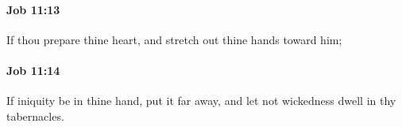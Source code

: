 		\paragraph{Job 11:13} %
			\label{JOB-11-13}

			If thou prepare thine heart, and stretch out thine hands toward him;


		\paragraph{Job 11:14} %
			\label{JOB-11-14}

			If iniquity be in thine hand, put it far away, and let not wickedness dwell in thy tabernacles.


